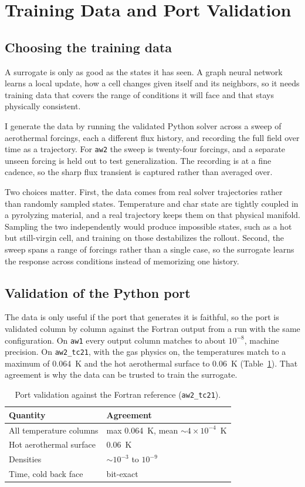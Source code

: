 \documentclass[11pt]{article}
\begin{document}
\section{Training Data and Port Validation}
\subsection{Choosing the training data}
A surrogate is only as good as the states it has seen. A graph neural network learns
a local update, how a cell changes given itself and its neighbors, so it needs
training data that covers the range of conditions it will face and that stays
physically consistent.

I generate the data by running the validated Python solver across a sweep of aerothermal
forcings, each a different flux history, and recording the full field over time as a
trajectory. For \texttt{aw2} the sweep is twenty-four forcings, and a separate unseen
forcing is held out to test generalization. The recording is at a fine cadence, so
the sharp flux transient is captured rather than averaged over.

Two choices matter. First, the data comes from real solver trajectories rather than
randomly sampled states. Temperature and char state are tightly coupled in a
pyrolyzing material, and a real trajectory keeps them on that physical manifold.
Sampling the two independently would produce impossible states, such as a hot but
still-virgin cell, and training on those destabilizes the rollout. Second, the sweep
spans a range of forcings rather than a single case, so the surrogate learns the
response across conditions instead of memorizing one history.

\subsection{Validation of the Python port}
The data is only useful if the port that generates it is faithful, so the port is
validated column by column against the Fortran output from a run with the same
configuration. On \texttt{aw1} every output column matches to about $10^{-8}$,
machine precision. On \texttt{aw2\_tc21}, with the gas physics on, the temperatures
match to a maximum of 0.064~K and the hot aerothermal surface to 0.06~K
(Table~\ref{tab:val}). That agreement is why the data can be trusted to train the
surrogate.

\begin{table}[H]
\caption{Port validation against the Fortran reference (\texttt{aw2\_tc21}).}
\label{tab:val}
\centering
\begin{tabular}{ll}
\toprule
Quantity & Agreement \\
\midrule
All temperature columns & max 0.064~K, mean $\sim$$4\times10^{-4}$~K \\
Hot aerothermal surface & 0.06~K \\
Densities & $\sim$$10^{-3}$ to $10^{-9}$ \\
Time, cold back face & bit-exact \\
\bottomrule
\end{tabular}
\end{table}
\end{document}
